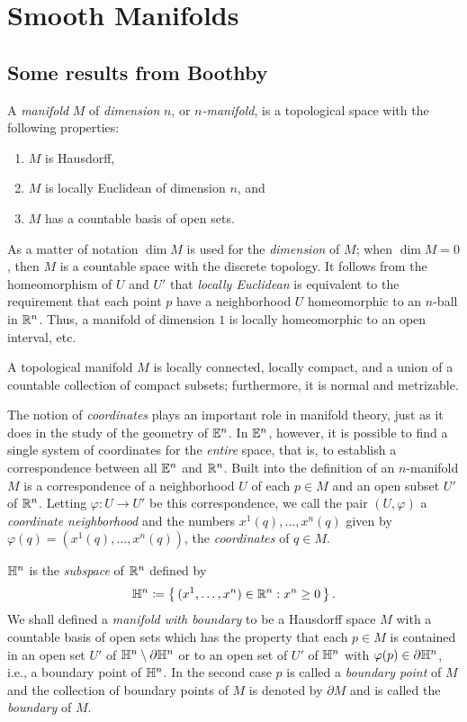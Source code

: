 \chapter{Smooth Manifolds}
\section{Some results from Boothby}
\begin{definition}[3.1]
A \emph{manifold} $M$ of \emph{dimension} $n$, or \emph{$n$-manifold}, is a
topological space with the following properties:
\begin{enumerate}[label=(\roman*)]
\item $M$ is Hausdorff,
\item $M$ is locally Euclidean of dimension $n$, and
\item $M$ has a countable basis of open sets.
\end{enumerate}
\end{definition}

As a matter of notation $\dim M$ is used for the \emph{dimension} of $M$;
when $\dim M=0$, then $M$ is a countable space with the discrete
topology. It follows from the homeomorphism of $U$ and $U'$ that
\emph{locally Euclidean} is equivalent to the requirement that each point
$p$ have a neighborhood $U$ homeomorphic to an $n$-ball in $\mathbb{R}^n$. Thus,
a manifold of dimension $1$ is locally homeomorphic to an open interval,
etc.

\begin{theorem}[3.6]
A topological manifold $M$ is locally connected, locally compact, and a
union of a countable collection of compact subsets; furthermore, it is
normal and metrizable.
\end{theorem}

The notion of \emph{coordinates} plays an important role in manifold
theory, just as it does in the study of the geometry of $\mathbb{E}^n$. In
$\mathbb{E}^n$, however, it is possible to find a single system of coordinates
for the \emph{entire} space, that is, to establish a correspondence between
all $\mathbb{E}^n$ and $\mathbb{R}^n$. Built into the definition of an $n$-manifold $M$
is a correspondence of a neighborhood $U$ of each $p\in M$ and an open
subset $U'$ of $\mathbb{R}^n$. Letting $\varphi\colon U\to U'$ be this
correspondence, we call the pair $(U,\varphi)$ a \emph{coordinate
  neighborhood} and the numbers $x^1(q),\dotsc,x^n(q)$ given by
$\varphi(q)=(x^1(q),\dotsc,x^n(q))$, the \emph{coordinates} of $q\in M$.

$\mathbb{H}^n$ is the \emph{subspace} of $\mathbb{R}^n$ defined by
\[
\mathbb{H}^n\coloneqq\left\{\,(x^1,\dotsc,x^n)\in\mathbb{R}^n:x^n\geq 0\,\right\}.
\]
We shall defined a \emph{manifold with boundary} to be a Hausdorff space
$M$ with a countable basis of open sets which has the property that each
$p\in M$ is contained in an open set $U'$ of $\mathbb{H}^n\setminus\partial\mathbb{H}^n$
or to an open set of $U'$ of $\mathbb{H}^n$ with $\varphi(p)\in\partial\mathbb{H}^n$,
i.e., a boundary point of $\mathbb{H}^n$. In the second case $p$ is called a
\emph{boundary point} of $M$ and the collection of boundary points of $M$
is denoted by $\partial M$ and is called the \emph{boundary} of $M$.

